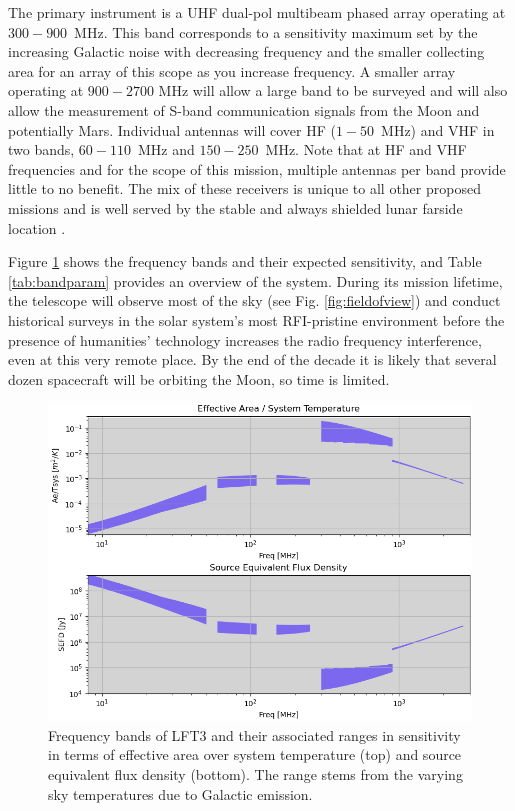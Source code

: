 The primary instrument is a UHF dual-pol multibeam phased array operating at $300-900$~MHz.  This band corresponds to a sensitivity maximum set by the increasing Galactic noise with decreasing frequency and the smaller collecting area for an array of this scope as you increase frequency.  A smaller array operating at $900-2700$ MHz will allow a large band to be surveyed and will also allow the measurement of S-band communication signals from the Moon and potentially Mars.
Individual antennas will cover HF ($1-50$~MHz) and VHF in two bands, $60-110$~MHz and $150-250$~MHz. Note that at HF and VHF frequencies and for the scope of this mission, multiple antennas per band provide little to no benefit.  The mix of these receivers is unique to all other proposed missions and is well served by the stable and always shielded lunar farside location \citep{2021arXiv210305085B}.

Figure \ref{fig:freqbands} shows the frequency bands and their expected sensitivity, and Table \ref{tab:bandparam} provides an overview of the system.  During its mission lifetime, the telescope will observe most of the sky (see Fig. \ref{fig:fieldofview}) and conduct historical surveys in the solar system's most RFI-pristine environment before the presence of humanities' technology increases the radio frequency interference, even at this very remote place.  By the end of the decade it is likely that several dozen spacecraft will be orbiting the Moon, so time is limited.

\begin{figure}
    \centering
    \includegraphics[width=0.75\linewidth]{figures/freqbands.png}
    \caption{Frequency bands of LFT3 and their associated ranges in sensitivity in terms of effective area over system temperature (top) and source equivalent flux density (bottom). The range stems from the varying sky temperatures due to Galactic emission.}
    \label{fig:freqbands}
\end{figure}

